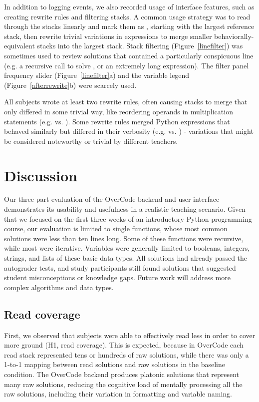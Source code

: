 In addition to logging  events, we also recorded usage of interface features, such as creating rewrite rules and filtering stacks. A common usage strategy was to read through the stacks linearly and mark them as , starting with the largest reference stack, then rewrite trivial variations in expressions to merge smaller behaviorally-equivalent stacks into the largest stack. Stack filtering (Figure~\ref{linefilter}) was sometimes used to review solutions that contained a particularly conspicuous line (e.g. a recursive call to solve , or an extremely long expression). The filter panel frequency slider (Figure~\ref{linefilter}a) and the variable legend (Figure~\ref{afterrewrite}b) were scarcely used.

All subjects wrote at least two rewrite rules, often causing stacks to merge that only differed in some trivial way, like reordering operands in multiplication statements (e.g.  vs. ). Some rewrite rules merged Python expressions that behaved similarly but differed in their verbosity (e.g.  vs. ) - variations that might be considered noteworthy or trivial by different teachers.
\section{Discussion}

Our three-part evaluation of the OverCode backend and user interface demonstrates its usability and usefulness in a realistic teaching scenario. Given that we focused on the first three weeks of an introductory Python programming course, our evaluation is limited to single functions, whose most common solutions were less than ten lines long. Some of these functions were recursive, while most were iterative. Variables were generally limited to booleans, integers, strings, and lists of these basic data types. All solutions had already passed the autograder tests, and study participants still found solutions that suggested student misconceptions or knowledge gaps. Future work will address more complex algorithms and data types.

\subsection{Read coverage}
First, we observed that subjects were able to effectively read less in order to cover more ground (H1, read coverage). This is expected, because in OverCode each read stack represented tens or hundreds of raw solutions, while there was only a 1-to-1 mapping between read solutions and raw solutions in the baseline condition. The OverCode backend produces platonic solutions that represent many raw solutions, reducing the cognitive load of mentally processing all the raw solutions, including their variation in formatting and variable naming.


